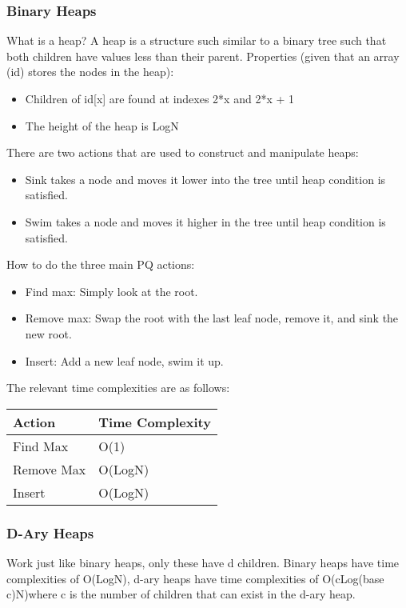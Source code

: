\documentclass[11pt]{article}
\begin{document}
\subsubsection*{Binary Heaps}
\label{sec:org0104ed6}
What is a heap?
A heap is a structure such similar to a binary tree such that both children have values less than their parent.
Properties (given that an array (id) stores the nodes in the heap):
\begin{itemize}
\item Children of id[x] are found at indexes 2*x and 2*x + 1
\item The height of the heap is LogN
\end{itemize}

There are two actions that are used to construct and manipulate heaps:
\begin{itemize}
\item Sink takes a node and moves it lower into the tree until heap condition is satisfied.
\item Swim takes a node and moves it higher in the tree until heap condition is satisfied.
\end{itemize}

How to do the three main PQ actions:
\begin{itemize}
\item Find max: Simply look at the root.
\item Remove max: Swap the root with the last leaf node, remove it, and sink the new root.
\item Insert: Add a new leaf node, swim it up.
\end{itemize}

The relevant time complexities are as follows:
\begin{center}
\begin{tabular}{ll}
Action & Time Complexity\\
\hline
Find Max & O(1)\\
Remove Max & O(LogN)\\
Insert & O(LogN)\\
\end{tabular}
\end{center}

\subsubsection*{D-Ary Heaps}
\label{sec:org2869a83}
Work just like binary heaps, only these have d children.
Binary heaps have time complexities of O(LogN), d-ary heaps have time complexities of O(cLog(base c)N)where c is the number of children that can exist in the d-ary heap.
\end{document}
